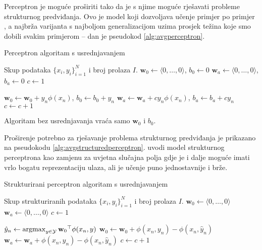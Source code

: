 Perceptron \citep{rosenblatt1958perceptron} je moguće proširiti tako da je s
njime moguće rješavati probleme strukturnog predviđanja. Ovo je model koji
dozvoljava učenje primjer po primjer , a najbrža varijanta
s najboljom generalizacijom uzima prosjek težina koje smo dobili svakim
primjerom \citep{freund1999large,gentile2002new} -- dan je pseudokod
\ref{alg:avgperceptron}.

\begin{algorithm}
\caption{Perceptron algoritam s usrednjavanjem}\label{alg:avgperceptron}
\begin{algorithmic}[1]
\Require Skup podataka $\{x_i, y_i\}_{i=1}^N$ i broj prolaza $I$.
\State $\mathbf{w}_0 \gets \langle 0, \ldots, 0 \rangle$, $b_0 \gets 0$
\State $\mathbf{w}_a \gets \langle 0, \ldots, 0 \rangle$, $b_a \gets 0$
\State $c \gets 1$


    \State $\mathbf{w}_0 \gets \mathbf{w}_0 + y_n \phi(x_n)$, $b_0 \gets b_0 + y_n$
    \State $\mathbf{w}_a \gets \mathbf{w}_a + c y_n \phi(x_n)$, $b_a \gets b_a + c y_n$
    \EndIf
    \State $c \gets c + 1$
  \EndFor

\EndFor

\State {}
\end{algorithmic}
\end{algorithm}

Algoritam bez usrednjavanja vraća samo $\mathbf{w}_0$ i $b_0$.

Proširenje potrebno za rješavanje problema strukturnog predviđanja je prikazano
na pseudokodu \ref{alg:avgstructuredperceptron}.
\citet{collins2002discriminative} uvodi model strukturnog perceptrona
 kao zamjenu za uvjetna slučajna polja gdje je i
dalje moguće imati vrlo bogatu reprezentaciju ulaza, ali je učenje puno
jednostavnije i brže.

\begin{algorithm}
\caption{Strukturirani perceptron algoritam s usrednjavanjem}
\label{alg:avgstructuredperceptron}
\begin{algorithmic}[1]
\Require Skup strukturiranih podataka $\{x_i, y_i\}_{i=1}^N$ i broj prolaza $I$.
\State $\mathbf{w}_0 \gets \langle 0, \ldots, 0 \rangle$
\State $\mathbf{w}_a \gets \langle 0, \ldots, 0 \rangle$
\State $c \gets 1$

    \State $\hat{y}_n \gets \operatorname*{argmax}_{y \in \mathcal{Y}} {\mathbf{w}_0}^\top \phi(x_n, y)$ \label{alg:avgstructuredperceptron:argmax}
    \State $\mathbf{w}_0 \gets \mathbf{w}_0 + \phi(x_n, y_n) - \phi(x_n, \hat{y}_n)$
    \State $\mathbf{w}_a \gets \mathbf{w}_a + \phi(x_n, y_n) - \phi(x_n, \hat{y}_n)$
    \EndIf
    \State $c \gets c + 1$
  \EndFor

\EndFor

\State {}
\end{algorithmic}
\end{algorithm}

